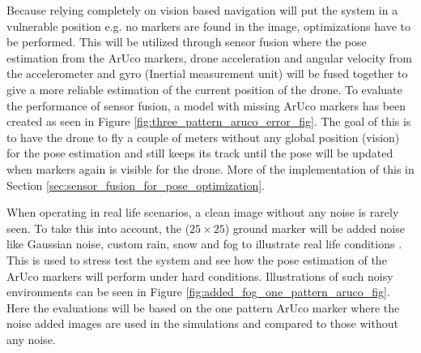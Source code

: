 \documentclass[../Head/report.tex]{subfiles}
\begin{document}
Because relying completely on vision based navigation will put the system in a vulnerable position e.g. no markers are found in the image, optimizations have to be performed. This will be utilized through sensor fusion where the pose estimation from the ArUco markers, drone acceleration and angular velocity from the accelerometer and gyro (Inertial measurement unit) will be fused together to give a more reliable estimation of the current position of the drone. To evaluate the performance of sensor fusion, a model with missing ArUco markers has been created as seen in Figure \ref{fig:three_pattern_aruco_error_fig}. The goal of this is to have the drone to fly a couple of meters without any global position (vision) for the pose estimation and still keeps its track until the pose will be updated when markers again is visible for the drone. More of the implementation of this in Section \ref{sec:sensor_fusion_for_pose_optimization}. 

When operating in real life scenarios, a clean image without any noise is rarely seen. To take this into account, the ($25\times25$) ground marker will be added noise like Gaussian noise, custom rain, snow and fog to illustrate real life conditions \cite{imgaug}. This is used to stress test the system and see how the pose estimation of the ArUco markers will perform under hard conditions. Illustrations of such noisy environments can be seen in Figure \ref{fig:added_fog_one_pattern_aruco_fig}. Here the evaluations will be based on the one pattern ArUco marker where the noise added images are used in the simulations and compared to those without any noise.      
\end{document}
